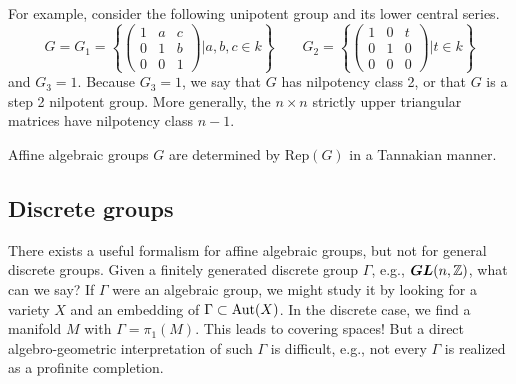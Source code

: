For example, consider the following unipotent group and its lower central series.
\[
G = G_1 = \left\{ \left(\begin{array}{ccc}
1 & a & c \\
0 & 1 & b \\
0 & 0 & 1
\end{array} \right) \left| a, b, c \in k \right. \right\} \qquad
G_2 = \left\{ \left(\begin{array}{ccc}
1 & 0 & t \\
0 & 1 & 0 \\
0 & 0 & 0
\end{array} \right) \left| t \in k \right. \right\}
\]
and $G_3 = 1$. Because $G_3 = 1$, we say that $G$ has nilpotency class 2, or that $G$ is a step 2 nilpotent group. More generally, the $n \times n$ strictly upper triangular matrices have nilpotency class $n-1$.

\begin{rem}
Affine algebraic groups $G$ are determined by $\mathrm{Rep}(G)$ in a Tannakian manner.
\end{rem}

\subsection{Discrete groups}
There exists a useful formalism for affine algebraic groups, but not for general discrete groups. Given a finitely generated discrete group $\Gamma$, e.g., $\boldsymbol{GL}(n, \mathbb{Z})$, what can we say? If $\Gamma$ were an algebraic group, we might study it by looking for a variety $X$ and an embedding of $\Gamma \subset \mathrm{Aut}(X)$. In the discrete case, we find a manifold $M$ with $\Gamma = \pi_1(M)$. This leads to covering spaces! But a direct algebro-geometric interpretation of such $\Gamma$ is difficult, e.g., not every $\Gamma$ is realized as a profinite completion.

